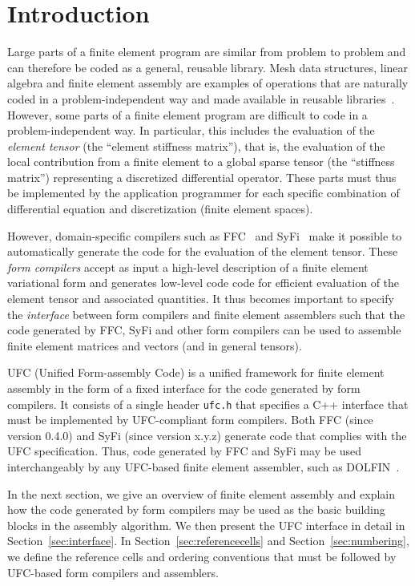 \chapter{Introduction}
\label{sec:introduction}

Large parts of a finite element program are similar from problem to
problem and can therefore be coded as a general, reusable library.
Mesh data structures, linear algebra and finite element assembly are
examples of operations that are naturally coded in a
problem-independent way and made available in reusable
libraries~\cite{www:fenics,www:petsc,www:sundance,www:deal.II,www:trilinos,www:diffpack}.
However, some parts of a finite element program are difficult to code
in a problem-independent way. In particular, this includes the
evaluation of the \emph{element tensor} (the ``element stiffness
matrix''), that is, the evaluation of the local contribution from a
finite element to a global sparse tensor (the ``stiffness matrix'')
representing a discretized differential operator. These parts must
thus be implemented by the application programmer for each specific
combination of differential equation and discretization (finite
element spaces).

However, domain-specific compilers such as
FFC~\cite{www:ffc,logg:article:07,logg:article:09,logg:article:10,logg:article:11}
and SyFi~\cite{www:syfi} make it possible to automatically generate
the code for the evaluation of the element tensor. These \emph{form
compilers} accept as input a high-level description of a finite
element variational form and generates low-level code code for
efficient evaluation of the element tensor and associated quantities.
It thus becomes important to specify the \emph{interface} between form
compilers and finite element assemblers such that the code generated
by FFC, SyFi and other form compilers can be used to assemble finite
element matrices and vectors (and in general tensors).

UFC (Unified Form-assembly Code) is a unified framework for finite
element assembly in the form of a fixed interface for the code
generated by form compilers. It consists of a single header
\texttt{ufc.h} that specifies a C++ interface that must be implemented
by UFC-compliant form compilers. Both FFC (since version 0.4.0) and
SyFi (since version x.y.z) generate code that complies with the UFC
specification. Thus, code generated by FFC and SyFi may be used
interchangeably by any UFC-based finite element assembler, such as
DOLFIN~\cite{www:dolfin}.

In the next section, we give an overview of finite element assembly and
explain how the code generated by form compilers may be used as the
basic building blocks in the assembly algorithm. We then present the
UFC interface in detail in Section~\ref{sec:interface}. In
Section~\ref{sec:referencecells} and Section~\ref{sec:numbering}, we
define the reference cells and ordering conventions that must be
followed by UFC-based form compilers and assemblers.
